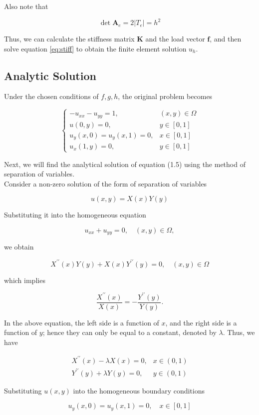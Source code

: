 \documentclass{article}
\begin{document}
Also note that

$$
\operatorname{det} \boldsymbol{A}_{e}=2\left|T_{e}\right|=h^{2}
$$

Thus, we can calculate the stiffness matrix \( \boldsymbol{K} \) and the load vector \( \boldsymbol{f} \), and then solve equation \eqref{eq:stiff} to obtain the finite element solution \( u_{h} \).
\subsection{Analytic Solution}
Under the chosen conditions of \( f, g, h \), the original problem becomes

\[
\begin{cases}-u_{x x}-u_{y y}=1, & (x, y) \in \Omega  \\ u(0, y)=0, & y \in[0,1] \\ u_{y}(x, 0)=u_{y}(x, 1)=0, & x \in[0,1] \\ u_{x}(1, y)=0, & y \in[0,1]\end{cases}
\]

Next, we will find the analytical solution of equation (1.5) using the method of separation of variables.\\
Consider a non-zero solution of the form of separation of variables

$$
u(x, y)=X(x) Y(y)
$$

Substituting it into the homogeneous equation

$$
u_{x x}+u_{y y}=0, \quad(x, y) \in \Omega,
$$

we obtain

$$
X^{\prime \prime}(x) Y(y)+X(x) Y^{\prime \prime}(y)=0, \quad(x, y) \in \Omega
$$

which implies

$$
\frac{X^{\prime \prime}(x)}{X(x)}=-\frac{Y^{\prime \prime}(y)}{Y(y)} .
$$

In the above equation, the left side is a function of \( x \), and the right side is a function of \( y \); hence they can only be equal to a constant, denoted by \( \lambda \). Thus, we have

$$
\begin{array}{ll}
X^{\prime \prime}(x)-\lambda X(x)=0, & x \in(0,1) \\
Y^{\prime \prime}(y)+\lambda Y(y)=0, & y \in(0,1)
\end{array}
$$

Substituting \( u(x, y) \) into the homogeneous boundary conditions

$$
u_{y}(x, 0)=u_{y}(x, 1)=0, \quad x \in[0,1]
$$
\end{document}
